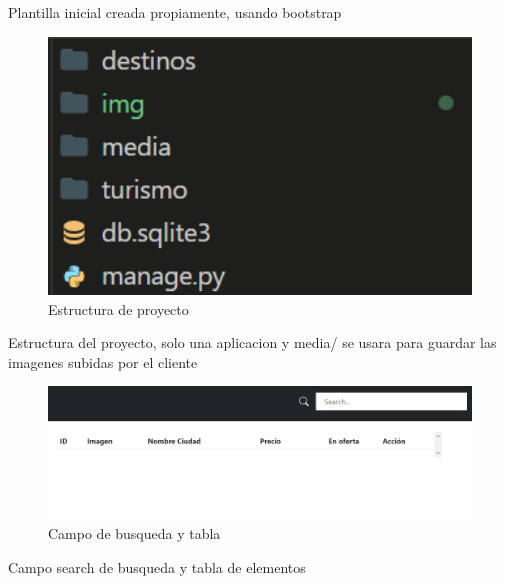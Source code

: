 \documentclass{article}
\begin{document}
        Plantilla inicial creada propiamente, usando bootstrap
        
        \begin{figure}
            \centering
            \includegraphics[width=150mm]{img/img1.png}
            \caption{Estructura de proyecto}
            \label{fig:enter-label}
        \end{figure}

        Estructura del proyecto, solo una aplicacion y media/ se usara para guardar las imagenes subidas por el cliente

        \begin{figure}
            \centering
            \includegraphics[width=150mm]{img/img2.png}
            \caption{Campo de busqueda y tabla}
            \label{fig:enter-label}
        \end{figure}

        Campo search de busqueda y tabla de elementos
        
\end{document}
